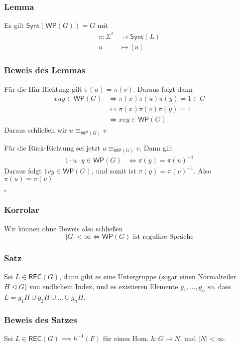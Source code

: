 \documentclass[12pt, german]{article}
\newcommand{\sigstern}{\Sigma^\ast}
\newcommand{\inv}{^{-1}}
\newcommand{\rec}{\mathsf{REC}}
\newcommand{\synt}{\mathsf{Synt}}
\newcommand{\wop}{\mathsf{WP}}
\newcommand{\equivWP}{\equiv_{\mathsf{WP}(G)}}
\newcommand{\bewiesen}{
	
	\begin{flushright}
		$\square$  \\
\end{flushright}}
\begin{document}
	\subsubsection{Lemma}
	Es gilt $\synt(\wop(G))=G$ mit 
	\begin{align*}
		\pi : \sigstern &\to \synt(L) \\
		u &\mapsto [u]
	\end{align*}
	
	\subsubsection{Beweis des Lemmas}
	Für die Hin-Richtung gilt $\pi(u) = \pi(v)$. Daraus folgt dann
	\begin{align*}
		xuy \in \wop(G) &\iff \pi(x)\pi(u)\pi(y) = 1 \in G \\
		&\iff \pi(x)\pi(v)\pi(y) = 1 \\
		&\iff xvy \in \wop(G)
	\end{align*}
	Daraus schließen wir $u \equivWP v$
	\newline
	
	Für die Rück-Richtung sei jetzt $u \equivWP v$. Dann gilt 
	\begin{align*}
		1\cdot u \cdot y \in \wop(G) &\iff  \pi(y) = \pi(u)\inv
	\end{align*}
	Daraus folgt $1vy \in \wop(G)$, und somit ist $\pi(y) = \pi(v)\inv$. Also $\pi(u) = \pi(v)$
	\bewiesen
	
	\subsubsection{Korrolar}
	Wir können ohne Beweis also schließen $$|G| < \infty \iff \wop(G) \text{ ist reguläre Spräche}$$
	
	\subsubsection{Satz}
	Sei $L \in \rec(G)$, dann gibt es eine Untergruppe (sogar einen Normalteiler $H \trianglelefteq G$) von endlichem Index, und es existieren Elemente
	$g_1, \ldots, g_n$ so, dass $L = g_1H \cup g_2H \cup \ldots \cup g_nH$.   
	
	\subsubsection{Beweis des Satzes}
	Sei $L \in \rec(G) \implies h\inv(F)$ für einen Hom. $h:G \to N$, und $|N| < \infty$. \\
	
\end{document}
